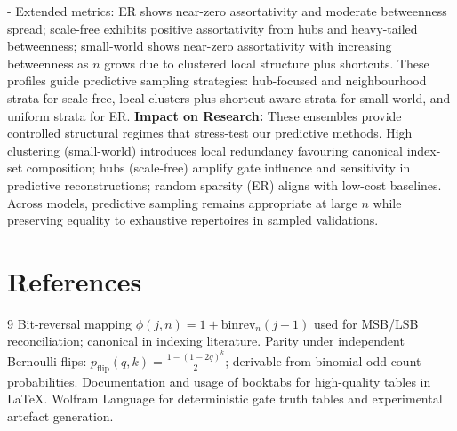 \documentclass[11pt]{article}
\begin{document}
 - Extended metrics: ER shows near-zero assortativity and moderate betweenness spread; scale-free exhibits positive assortativity from hubs and heavy-tailed betweenness; small-world shows near-zero assortativity with increasing betweenness as $n$ grows due to clustered local structure plus shortcuts. These profiles guide predictive sampling strategies: hub-focused and neighbourhood strata for scale-free, local clusters plus shortcut-aware strata for small-world, and uniform strata for ER.
\textbf{Impact on Research:} These ensembles provide controlled structural regimes that stress-test our predictive methods. High clustering (small-world) introduces local redundancy favouring canonical index-set composition; hubs (scale-free) amplify gate influence and sensitivity in predictive reconstructions; random sparsity (ER) aligns with low-cost baselines. Across models, predictive sampling remains appropriate at large $n$ while preserving equality to exhaustive repertoires in sampled validations.

\section{References}
\begin{thebibliography}{9}
 Bit-reversal mapping $\phi(j,n)=1+\mathrm{binrev}_n(j-1)$ used for MSB/LSB reconciliation; canonical in indexing literature.
 Parity under independent Bernoulli flips: $p_{\mathrm{flip}}(q,k)=\frac{1-(1-2q)^k}{2}$; derivable from binomial odd-count probabilities.
 Documentation and usage of booktabs for high-quality tables in LaTeX.
 Wolfram Language for deterministic gate truth tables and experimental artefact generation.
\end{thebibliography}
\end{document}
